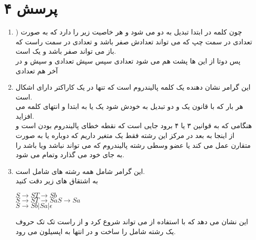 \documentclass[a4paper]{article}
\begin{document}
\section*{پرسش ۴}
\begin{enumerate}[label=\Alph*]
\item{)}
چون کلمه در ابتدا تبدیل به دو
می شود و هر
خاصیت زیر را دارد که به صورت تعدادی 
در سمت چپ که می تواند تعدادش صفر باشد و تعدادی 
در سمت راست که باز می تواند صفر باشد و یک 
است.\\
پس دوتا از این ها پشت هم می شود تعدادی
سپس
سپش تعدادی 
و سپش
و در آخر هم تعدادی

\item{}
این گرامر نشان دهنده یک کلمه پالیندروم است که تنها در یک کاراکتر دارای اشکال است.\\
هر بار که با قانون یک و دو تبدیل به خودش شود یک 
یا 
به ابتدا و انتهای کلمه می افزاید.\\
هنگامی که به قوانین ۳ یا ۴ برود جایی است که نقطه خطای پالیندروم بودن است و از اینجا به بعد در مرکز این رشته فقط یک متغیر 
داریم که 
دوباره یا به صورت متقارن عمل می کند یا عضو وسطی رشته پالیندروم که می تواند نباشد ویا 
باشد را به جای خود می گذارد وتمام می شود.
\item{}
این گرامر شامل همه رشته های شامل
است.\\
به اشتقاق های زیر دقت کنید\\
\begin{latin}
$S \rightarrow ST \rightarrow Sb $ \\
$S \rightarrow ST \rightarrow SaS \rightarrow Sa$\\
$S \rightarrow Sb | Sa | \epsilon$\\
\end{latin}
این نشان می دهد که با استفاده از 
می تواند شروع کرد و از راست تک تک حروف یک رشته شامل
را ساخت
و در انتها 
به اپسیلون می رود.
\end{enumerate}

\pagebreak
\end{document}
